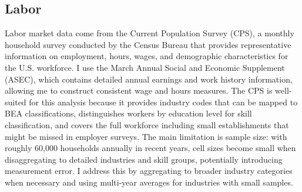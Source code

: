 \documentclass[12pt]{article}
\begin{document}
\subsection{Labor}\label{sec:labor_data}

Labor market data come from the Current Population Survey (CPS), a monthly household survey conducted by the Census Bureau that provides representative information on employment, hours, wages, and demographic characteristics for the U.S. workforce. I use the March Annual Social and Economic Supplement (ASEC), which contains detailed annual earnings and work history information, allowing me to construct consistent wage and hours measures. The CPS is well-suited for this analysis because it provides industry codes that can be mapped to BEA classifications, distinguishes workers by education level for skill classification, and covers the full workforce including small establishments that might be missed in employer surveys. The main limitation is sample size: with roughly 60,000 households annually in recent years, cell sizes become small when disaggregating to detailed industries and skill groups, potentially introducing measurement error. I address this by aggregating to broader industry categories when necessary and using multi-year averages for industries with small samples.
\end{document}
